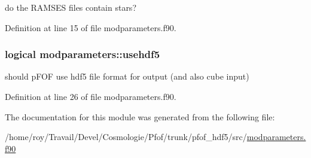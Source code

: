 do the R\-A\-M\-S\-E\-S files contain stars? 



Definition at line 15 of file modparameters.\-f90.

\hypertarget{classmodparameters_a035ec12524f64b196a2244ba913b5677}{
\subsubsection[{usehdf5}]{\setlength{\rightskip}{0pt plus 5cm}logical modparameters\-::usehdf5}}\label{classmodparameters_a035ec12524f64b196a2244ba913b5677}


should p\-F\-O\-F use hdf5 file format for output (and also cube input) 



Definition at line 26 of file modparameters.\-f90.



The documentation for this module was generated from the following file\-:\begin{DoxyCompactItemize}
\item 
/home/roy/\-Travail/\-Devel/\-Cosmologie/\-Pfof/trunk/pfof\-\_\-hdf5/src/\hyperlink{pfof__hdf5_2src_2modparameters_8f90}{modparameters.\-f90}\end{DoxyCompactItemize}
